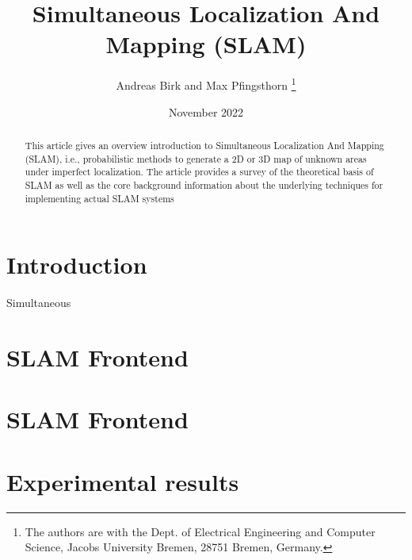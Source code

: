 \documentclass[english]{article}
\begin{document}
\title{Simultaneous Localization And Mapping (SLAM)}

\author{
Andreas Birk and Max Pfingsthorn
\thanks{The authors are with the Dept. of Electrical Engineering and
Computer Science, Jacobs University Bremen, 28751 Bremen, Germany.}
}
\date{November 2022}
\maketitle

\begin{abstract}
    This article gives an overview introduction to Simultaneous Localization
    And Mapping (SLAM), i.e., probabilistic methods to generate a 2D or 3D map
    of unknown areas under imperfect localization. The article provides a
    survey of the theoretical basis of SLAM as well as the core background
    information about the underlying techniques
    for implementing actual SLAM systems
\end{abstract}

\section{\label{sec:Intro}Introduction}Simultaneous

\section{\label{sec:SLAM_fronted}SLAM Frontend}

\section{\label{sec:SLAM_fronted}SLAM Frontend}

\section{\label{sec:Exper_result}Experimental results}




\end{document}
